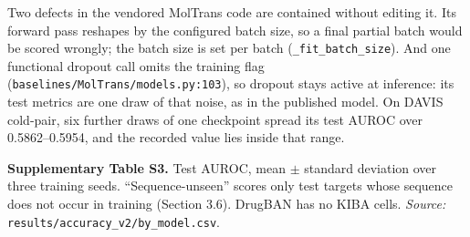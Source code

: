 \documentclass[
  10pt,
]{article}
\begin{document}
Two defects in the vendored MolTrans code are contained without editing it. Its forward pass reshapes by the configured batch size, so a final partial batch would be scored wrongly; the batch size is set per batch (\texttt{\_fit\_batch\_size}). And one functional dropout call omits the training flag (\texttt{baselines/MolTrans/models.py:103}), so dropout stays active at inference: its test metrics are one draw of that noise, as in the published model. On DAVIS cold-pair, six further draws of one checkpoint spread its test AUROC over 0.5862--0.5954, and the recorded value lies inside that range.

\textbf{Supplementary Table S3.} Test AUROC, mean $\pm$ standard deviation over three training seeds. ``Sequence-unseen'' scores only test targets whose sequence does not occur in training (Section 3.6). DrugBAN has no KIBA cells. \emph{Source:} \texttt{results/accuracy\_v2/by\_model.csv}.
\end{document}
